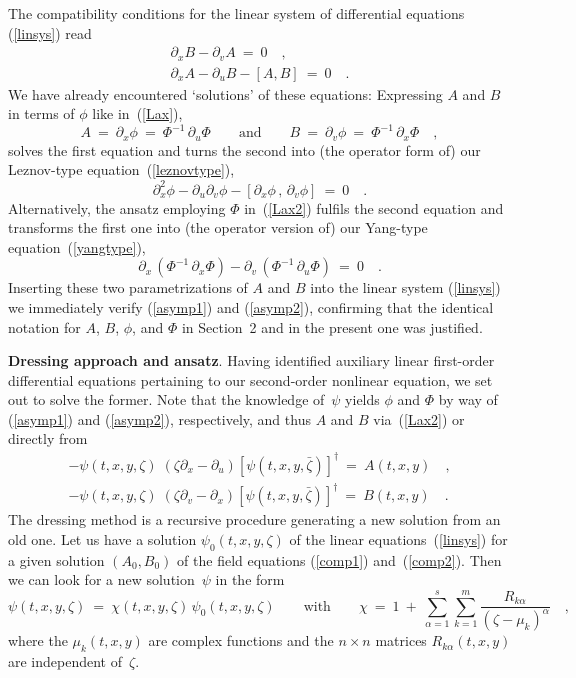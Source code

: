 \documentclass[a4paper,11pt]{article}
\numberwithin{equation}{section}
\def\a{\alpha}
\def\pa{\mbox{$\partial$}}
\begin{document}
The compatibility conditions for the linear system of differential equations
(\ref{linsys}) read
\begin{align}
\pa_x B -\pa_v A\ =\ 0 \quad ,\label{comp1} \\[4pt]
\pa_x A -\pa_u B -[A,B]\ =\ 0 \quad . \label{comp2}
\end{align}
We have already encountered `solutions' of these equations:
Expressing $A$ and $B$ in terms of $\phi$ like in~(\ref{Lax}),
\begin{equation} \label{Lax2}
A\ =\ \pa_x\phi\ =\ \Phi^{-1}\,\pa_u\Phi
\qquad\textrm{and}\qquad
B\ =\ \pa_v\phi\ =\ \Phi^{-1}\,\pa_x\Phi \quad,
\end{equation}
solves the first equation and turns the second into (the operator form of)
our Leznov-type equation~(\ref{leznovtype}),
\begin{equation} \label{leznovtype2}
\pa_x^2\phi -\pa_u\pa_v\phi -
[\pa_x \phi \,,\, \pa_v \phi] \ =\ 0 \quad.
\end{equation}
Alternatively, the ansatz employing $\Phi$ in~(\ref{Lax2})
fulfils the second equation and transforms the first one into (the operator
version of) our Yang-type equation~(\ref{yangtype}),
\begin{equation} \label{yangtype2}
\pa_x\,(\Phi^{-1}\,\pa_x\Phi)-\pa_v\,(\Phi^{-1}\,\pa_u\Phi)\ =\ 0 \quad.
\end{equation}
Inserting these two parametrizations of $A$ and $B$ into the linear system
(\ref{linsys}) we immediately verify (\ref{asymp1}) and (\ref{asymp2}),
confirming that the identical notation for $A$, $B$, $\phi$, and $\Phi$
in Section~2 and in the present one was justified.

\noindent
{\bf Dressing approach and ansatz}.
Having identified auxiliary linear first-order differential equations
pertaining to our second-order nonlinear equation, we set out to solve
the former. Note that the knowledge of~$\psi$ yields $\phi$ and $\Phi$
by way of (\ref{asymp1}) and (\ref{asymp2}), respectively,
and thus $A$ and $B$ via~(\ref{Lax2}) or directly from
\begin{align}
-\psi(t,x,y,\zeta)\;(\zeta\pa_x-\pa_u)[\psi(t,x,y,\bar{\zeta})]^{\dagger}\
=\ A(t,x,y) \quad , \label{A1} \\[4pt]
-\psi(t,x,y,\zeta)\;(\zeta\pa_v-\pa_x)[\psi(t,x,y,\bar{\zeta})]^{\dagger}\
=\ B(t,x,y) \quad \label{B1}.
\end{align}
The dressing method is a recursive procedure generating a new solution
from an old one. Let us have a solution $\psi_0(t,x,y,\zeta)$ of the
linear equations~(\ref{linsys}) for a given solution $(A_0,B_0)$
of the field equations (\ref{comp1}) and~(\ref{comp2}).
Then we can look for a new solution~$\psi$ in the form
\begin{equation} \label{generalansatz}
\psi(t,x,y,\zeta)\ =\ \chi(t,x,y,\zeta)\,\psi_0(t,x,y,\zeta)
\qquad\textrm{with}\qquad
\chi\ =\ 1\ +\ \sum_{\a=1}^s\sum_{k=1}^m\frac{R_{k\a}}{(\zeta-\mu_k)^\a}\quad,
\end{equation}
where the $\mu_k(t,x,y)$ are complex functions
and the $n{\times}n$ matrices $R_{k\a}(t,x,y)$ are independent of~$\zeta$.
\end{document}
